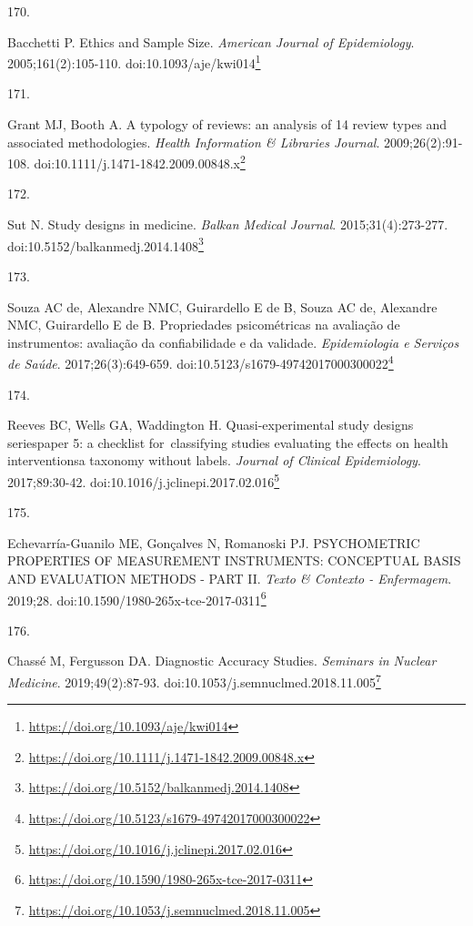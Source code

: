 \documentclass[
  a4paper,
]{book}
\newlength{\cslhangindent}
\newlength{\csllabelwidth}
\newlength{\cslentryspacingunit} %
\newenvironment{CSLReferences}[2] %
 {%
  \setlength{\parindent}{0pt}
  \ifodd #1
  \let\oldpar\par
  \def\par{\hangindent=\cslhangindent\oldpar}
  \fi
  \setlength{\parskip}{#2\cslentryspacingunit}
 }%
 {}
\newcommand{\CSLLeftMargin}[1]{\parbox[t]{\csllabelwidth}{#1}}
\newcommand{\CSLRightInline}[1]{\parbox[t]{\linewidth - \csllabelwidth}{#1}\break}
\renewcommand{\href}[2]{#2\footnote{\url{#1}}}
\begin{document}
\begin{CSLReferences}{0}{0}
\leavevmode{}%
\CSLLeftMargin{170. }%
\CSLRightInline{Bacchetti P. Ethics and Sample Size. \emph{American Journal of Epidemiology}. 2005;161(2):105-110. doi:\href{https://doi.org/10.1093/aje/kwi014}{10.1093/aje/kwi014}}

\leavevmode{}%
\CSLLeftMargin{171. }%
\CSLRightInline{Grant MJ, Booth A. A typology of reviews: an analysis of 14 review types and associated methodologies. \emph{Health Information \& Libraries Journal}. 2009;26(2):91-108. doi:\href{https://doi.org/10.1111/j.1471-1842.2009.00848.x}{10.1111/j.1471-1842.2009.00848.x}}

\leavevmode{}%
\CSLLeftMargin{172. }%
\CSLRightInline{Sut N. Study designs in medicine. \emph{Balkan Medical Journal}. 2015;31(4):273-277. doi:\href{https://doi.org/10.5152/balkanmedj.2014.1408}{10.5152/balkanmedj.2014.1408}}

\leavevmode{}%
\CSLLeftMargin{173. }%
\CSLRightInline{Souza AC de, Alexandre NMC, Guirardello E de B, Souza AC de, Alexandre NMC, Guirardello E de B. Propriedades psicométricas na avaliação de instrumentos: avaliação da confiabilidade e da validade. \emph{Epidemiologia e Serviços de Saúde}. 2017;26(3):649-659. doi:\href{https://doi.org/10.5123/s1679-49742017000300022}{10.5123/s1679-49742017000300022}}

\leavevmode{}%
\CSLLeftMargin{174. }%
\CSLRightInline{Reeves BC, Wells GA, Waddington H. Quasi-experimental study designs series{\textemdash}paper 5: a checklist for~classifying studies evaluating the effects on health interventions{\textemdash}a taxonomy without labels. \emph{Journal of Clinical Epidemiology}. 2017;89:30-42. doi:\href{https://doi.org/10.1016/j.jclinepi.2017.02.016}{10.1016/j.jclinepi.2017.02.016}}

\leavevmode{}%
\CSLLeftMargin{175. }%
\CSLRightInline{Echevarría-Guanilo ME, Gonçalves N, Romanoski PJ. PSYCHOMETRIC PROPERTIES OF MEASUREMENT INSTRUMENTS: CONCEPTUAL BASIS AND EVALUATION METHODS - PART II. \emph{Texto \& Contexto - Enfermagem}. 2019;28. doi:\href{https://doi.org/10.1590/1980-265x-tce-2017-0311}{10.1590/1980-265x-tce-2017-0311}}

\leavevmode{}%
\CSLLeftMargin{176. }%
\CSLRightInline{Chassé M, Fergusson DA. Diagnostic Accuracy Studies. \emph{Seminars in Nuclear Medicine}. 2019;49(2):87-93. doi:\href{https://doi.org/10.1053/j.semnuclmed.2018.11.005}{10.1053/j.semnuclmed.2018.11.005}}


\end{CSLReferences}
\end{document}
